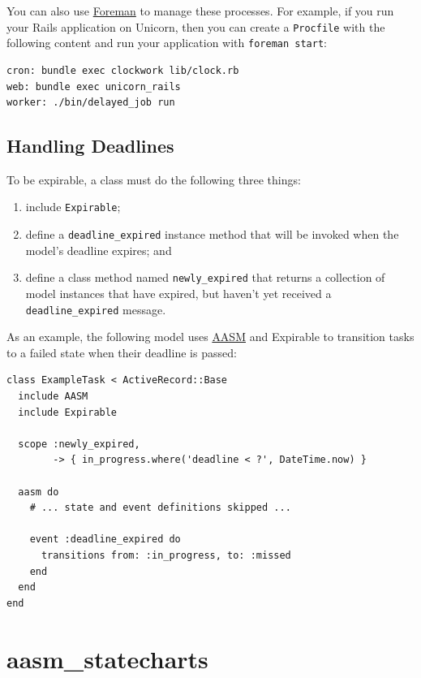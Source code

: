 \documentclass[document.tex]{subfiles}
\begin{document}
You can also use \href{http://blog.daviddollar.org/2011/05/06/introducing-foreman.html}{Foreman}
to manage these processes. For example, if you run your Rails application on Unicorn, then
you can create a {\tt Procfile} with the following content and run your application with {\tt foreman start}:

\begin{lstlisting}
cron: bundle exec clockwork lib/clock.rb
web: bundle exec unicorn_rails
worker: ./bin/delayed_job run

\end{lstlisting}   %

\subsection{Handling Deadlines}

To be expirable, a class must do the following three things:

\begin{enumerate}
\item include {\tt Expirable};
\item define a {\tt deadline\_expired} instance method that will be invoked when the model's deadline expires; and
\item define a class method named {\tt newly\_expired} that returns a collection of model instances that have expired, but haven't yet received a {\tt deadline\_expired} message.
\end{enumerate}

\pagebreak

As an example, the following model uses \href{https://github.com/aasm/aasm}{AASM} and Expirable to transition tasks to a failed state when their deadline is passed:

\begin{lstlisting}
class ExampleTask < ActiveRecord::Base
  include AASM
  include Expirable
  
  scope :newly_expired,
        -> { in_progress.where('deadline < ?', DateTime.now) }

  aasm do
    # ... state and event definitions skipped ...

    event :deadline_expired do
      transitions from: :in_progress, to: :missed
    end
  end
end

\end{lstlisting}   %


\section{aasm\_statecharts}
\label{sec:aasm-statecharts-manual}
\end{document}
